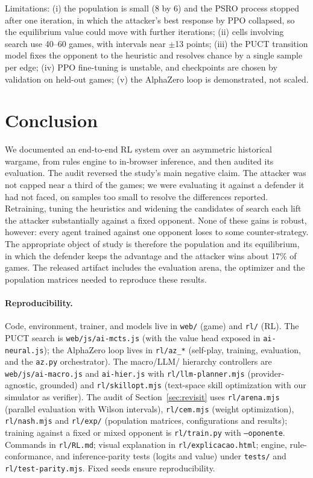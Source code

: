 \documentclass{article}
\begin{document}
Limitations: (i) the population is small (8 by 6) and the PSRO process stopped after one
iteration, in which the attacker's best response by PPO collapsed, so the equilibrium
value could move with further iterations; (ii) cells involving search use 40--60 games,
with intervals near $\pm$13 points; (iii) the PUCT transition model fixes the opponent to
the heuristic and resolves chance by a single sample per edge; (iv) PPO fine-tuning is
unstable, and checkpoints are chosen by validation on held-out games; (v) the AlphaZero
loop is demonstrated, not scaled.

\section{Conclusion}
We documented an end-to-end RL system over an asymmetric historical wargame, from rules
engine to in-browser inference, and then audited its evaluation. The audit reversed the
study's main negative claim. The attacker was not capped near a third of the games; we
were evaluating it against a defender it had not faced, on samples too small to resolve
the differences reported. Retraining, tuning the heuristics and widening the
candidates of search each lift the attacker substantially against a fixed opponent. None
of these gains is robust, however: every agent trained against one opponent loses to
some counter-strategy. The appropriate object of study is therefore the population and
its equilibrium, in which the defender keeps the advantage and the attacker wins about
17\% of games. The released artifact includes the evaluation arena, the optimizer and the
population matrices needed to reproduce these results.

\sloppy
\paragraph{Reproducibility.} Code, environment, trainer, and models live in \texttt{web/}
(game) and \texttt{rl/} (RL). The PUCT search is \texttt{web/js/ai-mcts.js} (with the value
head exposed in \texttt{ai-neural.js}); the AlphaZero loop lives in \texttt{rl/az\_*}
(self-play, training, evaluation, and the \texttt{az.py} orchestrator). The macro/LLM/
hierarchy controllers are \texttt{web/js/ai-macro.js} and \texttt{ai-hier.js} with
\texttt{rl/llm-planner.mjs} (provider-agnostic, grounded) and \texttt{rl/skillopt.mjs}
(text-space skill optimization with our simulator as verifier). The audit of
Section~\ref{sec:revisit} uses \texttt{rl/arena.mjs} (parallel evaluation with Wilson
intervals), \texttt{rl/cem.mjs} (weight optimization), \texttt{rl/nash.mjs} and
\texttt{rl/exp/} (population matrices, configurations and results); training against a
fixed or mixed opponent is \texttt{rl/train.py} with \texttt{--oponente}.
Commands in \texttt{rl/RL.md}; visual explanation in \texttt{rl/explicacao.html}; engine,
rule-conformance, and inference-parity tests (logits and value) under \texttt{tests/} and
\texttt{rl/test-parity.mjs}. Fixed seeds ensure reproducibility.
\end{document}
